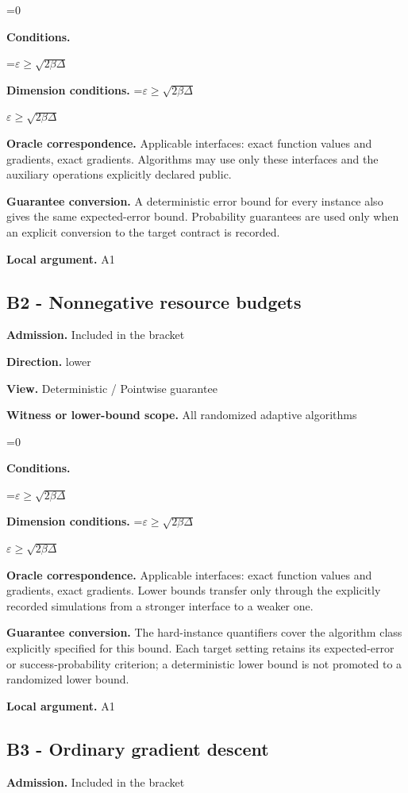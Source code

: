 \documentclass[10pt,a4paper]{article}
\newcommand{\AtlasMath}[1]{\par\begingroup\centering\setbox0=\hbox{$\displaystyle #1$}\ifdim\wd0>1.4\linewidth\typeout{ATLAS WIDE FORMULA: \the\wd0}\fi\ifdim\wd0>\linewidth\resizebox{\linewidth}{!}{\box0}\else\box0\fi\par\endgroup}
\newcommand{\AtlasInlineMath}[1]{\begingroup\setbox0=\hbox{$#1$}\ifdim\wd0>.4\linewidth\endgroup\AtlasMath{#1}\else\endgroup$#1$\fi}
\begin{document}
\AtlasMath{0}
\textbf{Conditions.} 
\AtlasMath{\varepsilon\ge\sqrt{2\beta\Delta}}


\textbf{Dimension conditions.} \AtlasInlineMath{\varepsilon\ge\sqrt{2\beta\Delta}}

\textbf{Oracle correspondence.} Applicable interfaces: exact function values and gradients, exact gradients. Algorithms may use only these interfaces and the auxiliary operations explicitly declared public.

\textbf{Guarantee conversion.} A deterministic error bound for every instance also gives the same expected-error bound. Probability guarantees are used only when an explicit conversion to the target contract is recorded.

\textbf{Local argument.} A1

\subsection{B2 - Nonnegative resource budgets}
\textbf{Admission.} Included in the bracket

\textbf{Direction.} lower

\textbf{View.} Deterministic / Pointwise guarantee

\textbf{Witness or lower-bound scope.} All randomized adaptive algorithms

\AtlasMath{0}
\textbf{Conditions.} 
\AtlasMath{\varepsilon\ge\sqrt{2\beta\Delta}}


\textbf{Dimension conditions.} \AtlasInlineMath{\varepsilon\ge\sqrt{2\beta\Delta}}

\textbf{Oracle correspondence.} Applicable interfaces: exact function values and gradients, exact gradients. Lower bounds transfer only through the explicitly recorded simulations from a stronger interface to a weaker one.

\textbf{Guarantee conversion.} The hard-instance quantifiers cover the algorithm class explicitly specified for this bound. Each target setting retains its expected-error or success-probability criterion; a deterministic lower bound is not promoted to a randomized lower bound.

\textbf{Local argument.} A1

\subsection{B3 - Ordinary gradient descent}
\textbf{Admission.} Included in the bracket
\end{document}
